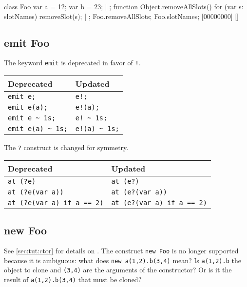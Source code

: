 \begin{urbiscript}
class Foo
{
  var a = 12;
  var b = 23;
} | {};
function Object.removeAllSlots()
{
  for (var s: slotNames)
    removeSlot(s);
} | {};
Foo.removeAllSlots;
Foo.slotNames;
[00000000] []
\end{urbiscript}

\subsection{emit Foo}

The keyword \lstinline{emit} is deprecated in favor of \lstinline{!}.

\begin{tabular}{|l|l|}
  \hline
  \textbf{Deprecated} & \textbf{Updated}  \\
  \hline
  \lstinline|emit e;|         & \lstinline|e!;|          \\
  \lstinline|emit e(a);|      & \lstinline|e!(a);|       \\
  \lstinline|emit e ~ 1s;|    & \lstinline|e! ~ 1s;|     \\
  \lstinline|emit e(a) ~ 1s;| & \lstinline|e!(a) ~ 1s;|  \\
  \hline
\end{tabular}

The \lstinline{?} construct is changed for symmetry.

\begin{tabular}{|l|l|}
  \hline
  \textbf{Deprecated} & \textbf{Updated}  \\
  \hline
  \lstinline|at (?e)|                  & \lstinline|at (e?)|\\
  \lstinline|at (?e(var a))|           & \lstinline|at (e?(var a))|\\
  \lstinline|at (?e(var a) if a == 2)| & \lstinline|at (e?(var a) if a == 2)|\\
  \hline
\end{tabular}


\subsection{new Foo}

See \autoref{sec:tut:ctor} for details on .  The construct
\lstinline{new Foo} is no longer supported because it is ambiguous:
what does \lstinline{new a(1,2).b(3,4)} mean?  Is
\lstinline{a(1,2).b} the object to clone and \lstinline{(3,4)} are the
arguments of the constructor?  Or is it the result of
\lstinline{a(1,2).b(3,4)} that must be cloned?

